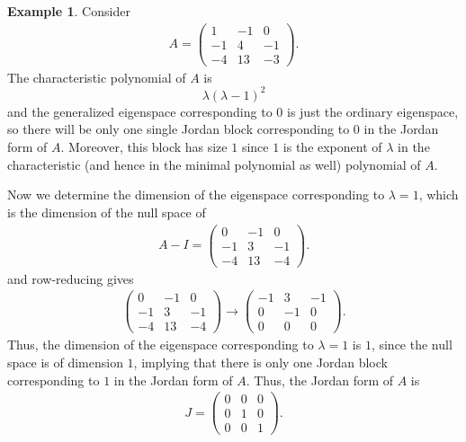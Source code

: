 \documentclass[11pt]{book}
\theoremstyle{definition}
\newtheorem{example}{Example}[section]
\numberwithin{equation}{subsection}
\begin{document}
\medskip

\begin{example}
Consider 
\begin{align*}
    A = \begin{pmatrix}
    1 & -1 & 0 \\
    -1 & 4 &  -1 \\
    -4 & 13 & -3 
    \end{pmatrix}.
\end{align*}
The characteristic polynomial of $A$ is 
$$\lambda(\lambda-1)^2$$
and the generalized eigenspace corresponding to $0$ is just the ordinary eigenspace, so there will be only one single Jordan block corresponding to $0$ in the Jordan form of $A$. Moreover, this block has size $1$ since $1$ is the exponent of $\lambda$ in the characteristic (and hence in the minimal polynomial as well) polynomial of $A$.

Now we determine the dimension of the eigenspace corresponding to $\lambda = 1$, which is the dimension of the null space of
\begin{align*}
    A - I = \begin{pmatrix}
    0 & -1 & 0 \\
    -1 & 3 &  -1 \\
    -4 & 13 & -4 
    \end{pmatrix}.
\end{align*}
and row-reducing gives
\begin{align*}
    \begin{pmatrix}
    0 & -1 & 0 \\
    -1 & 3 &  -1 \\
    -4 & 13 & -4 
    \end{pmatrix} \to \begin{pmatrix}
    -1 & 3 &  -1 \\
    0 & -1 & 0 \\
    0 & 0 & 0 
    \end{pmatrix}.
\end{align*}
Thus, the dimension of the eigenspace corresponding to $\lambda = 1$ is $1$, since the null space is of dimension $1$, implying that there is only one Jordan block corresponding to $1$ in the Jordan form of $A$. Thus, the Jordan form of $A$ is
\begin{align*}
    J = \begin{pmatrix}
    0 & 0 &  0 \\
    0 & 1 & 0 \\
    0 & 0 & 1
    \end{pmatrix}.
\end{align*}
\end{example}
\end{document}
